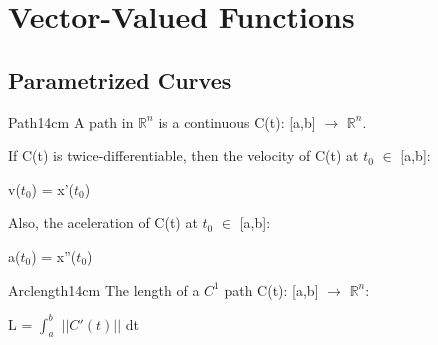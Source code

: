 \newpage

\section[Day 3: Vector-Valued Functions]{ Vector-Valued Functions }

\subsection{ Parametrized Curves }

    \begin{definition}{Path}{14cm}
        A {\color{lblue} path} in $\mathbb{R}^n$ is a continuous
        C(t): [a,b] $\rightarrow$ $\mathbb{R}^n$.

        \vspace{0.3cm}
        If C(t) is twice-differentiable, then the
        {\color{lblue} velocity} of C(t) at $t_0$ $\in$ [a,b]:

        \hspace{0.5cm}
        v($t_0$) = x'($t_0$)
        
        Also, the aceleration of C(t) at $t_0$ $\in$ [a,b]:

        \hspace{0.5cm}
        a($t_0$) = x''($t_0$)
    \end{definition}

    \vspace{0.5cm}



    \begin{definition}{Arclength}{14cm}
        The length of a $C^1$ path C(t): [a,b] $\rightarrow$ $\mathbb{R}^n$:

        \hspace{0.5cm}
        L = $\int_a^b$ $||C'(t)||$ dt
    \end{definition}

